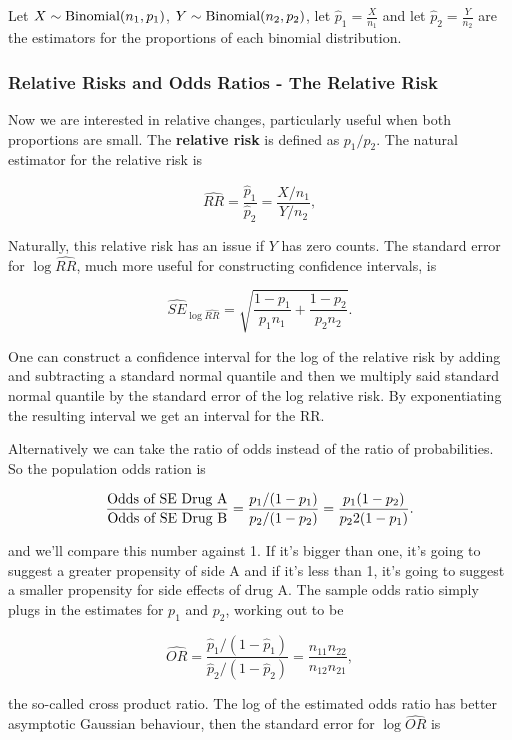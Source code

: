 \documentclass{homework}
\begin{document}
Let $X \sim \textnormal{Binomial}(n_1, p_1)$, $Y \sim \textnormal{Binomial}(n_2, p_2)$, let $\hat{p}_1 = \frac{X}{n_1}$ and let $\hat{p}_2 = \frac{Y}{n_2}$ are the estimators for the proportions of each binomial distribution. \\

\subsubsection{Relative Risks and Odds Ratios - The Relative Risk}

Now we are interested in relative changes, particularly useful when both proportions are small. The \textbf{relative risk} is defined as $p_1/p_2$. The natural estimator for the relative risk is 

$$
\hat{RR} = \frac{\hat{p}_1}{\hat{p}_2} = \frac{X/n_1}{Y/n_2},
$$

Naturally, this relative risk has an issue if $Y$ has zero counts. The standard error for $\log \hat{RR}$, much more useful for constructing confidence intervals, is

$$
\hat{SE}_{\log \hat{RR}} = \sqrt{\frac{1-p_1}{p_1n_1}+\frac{1-p_2}{p_2n_2}}.
$$

One can construct a confidence interval for the log of the relative risk by adding and subtracting a standard normal quantile and then we multiply said standard normal quantile by the standard error of the log relative risk. By exponentiating the resulting interval we  get an interval for the RR. 

Alternatively we can take the ratio of odds instead of the ratio of probabilities. So the population odds ration is 

$$
\frac{\textnormal{Odds of SE Drug A}}{\textnormal{Odds of SE Drug B}} = \frac{p_1/(1-p_1)}{p_2/(1-p_2)} = \frac{p_1(1-p_2)}{p_22(1-p_1)}.
$$

and we'll compare this number against 1. If it's bigger than one, it's going to suggest a greater propensity of side A and if it's less than 1, it's going to suggest a smaller propensity for side effects of drug A. The sample odds ratio simply plugs in the estimates for $p_1$ and $p_2$, working out to be 

$$
\hat{OR} = \frac{\hat{p}_1/(1-\hat{p}_1)}{\hat{p}_2/(1-\hat{p}_2)} = \frac{n_{11}n_{22}}{n_{12}n_{21}},
$$

the so-called cross product ratio. The log of the estimated odds ratio has better asymptotic Gaussian behaviour, then the standard error for $\log \hat{OR}$ is 
\end{document}

